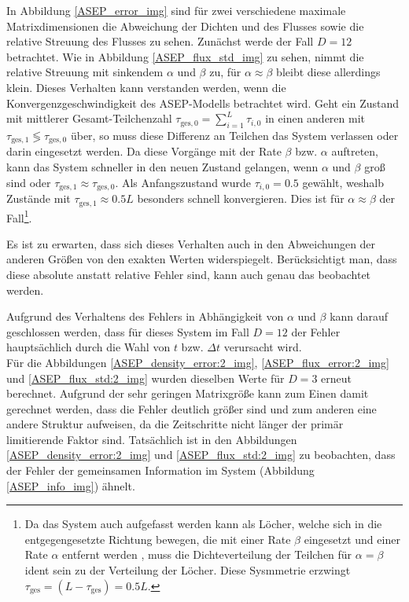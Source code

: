 \documentclass[10pt,a4paper]{report}
\begin{document}
In Abbildung \ref{ASEP_error_img} sind für zwei verschiedene maximale Matrixdimensionen die Abweichung der Dichten und des Flusses sowie die relative Streuung des Flusses zu sehen. Zunächst werde der Fall $D=12$ betrachtet. Wie in Abbildung \ref{ASEP_flux_std_img} zu sehen, nimmt die relative Streuung mit sinkendem $\alpha$ und $\beta$ zu, für $\alpha\approx\beta$ bleibt diese allerdings klein. Dieses Verhalten kann verstanden werden, wenn die Konvergenzgeschwindigkeit des ASEP-Modells betrachtet wird. Geht ein Zustand mit mittlerer Gesamt-Teilchenzahl $\tau_{\text{ges},0}=\sum_{i=1}^L\tau_{i,0}$ in einen anderen mit $\tau_{\text{ges},1}\lessgtr\tau_{\text{ges},0}$ über, so muss diese Differenz an Teilchen das System verlassen oder darin eingesetzt werden. Da diese Vorgänge mit der Rate $\beta$ bzw. $\alpha$ auftreten, kann das System schneller in den neuen Zustand gelangen, wenn $\alpha$ und $\beta$ groß sind oder $\tau_{\text{ges},1}\approx\tau_{\text{ges},0}$. Als Anfangszustand wurde $\tau_{i,0}=0.5$ gewählt, weshalb Zustände mit $\tau_{\text{ges},1}\approx 0.5L$ besonders schnell konvergieren. Dies ist für $\alpha\approx\beta$ der Fall\footnote{Da das System auch aufgefasst werden kann als Löcher, welche sich in die entgegengesetzte Richtung bewegen, die mit einer Rate $\beta$ eingesetzt und einer Rate $\alpha$ entfernt werden \cite{ASEP}, muss die Dichteverteilung der Teilchen für $\alpha=\beta$ ident sein zu der Verteilung der Löcher. Diese Sysmmetrie erzwingt $\tau_{\text{ges}}=(L-\tau_{\text{ges}})=0.5L$.}.


 Es ist zu erwarten, dass sich dieses Verhalten auch in den Abweichungen der anderen Größen von den exakten Werten widerspiegelt. Berücksichtigt man, dass diese absolute anstatt relative Fehler sind, kann auch genau das beobachtet werden.
 
Aufgrund des Verhaltens des Fehlers in Abhängigkeit von $\alpha$ und $\beta$ kann darauf geschlossen werden, dass für dieses System im Fall $D=12$ der Fehler hauptsächlich durch die Wahl von $t$ bzw. $\Delta t$ verursacht wird.\\



Für die Abbildungen \ref{ASEP_density_error:2_img}, \ref{ASEP_flux_error:2_img} und \ref{ASEP_flux_std:2_img} wurden dieselben Werte für $D=3$ erneut berechnet. Aufgrund der sehr geringen Matrixgröße kann zum Einen damit gerechnet werden, dass die Fehler deutlich größer sind und zum anderen eine andere Struktur aufweisen, da die Zeitschritte nicht länger der primär limitierende Faktor sind. Tatsächlich ist in den Abbildungen \ref{ASEP_density_error:2_img} und \ref{ASEP_flux_std:2_img} zu beobachten, dass der Fehler der gemeinsamen Information im System (Abbildung \ref{ASEP_info_img}) ähnelt. 
\end{document}
